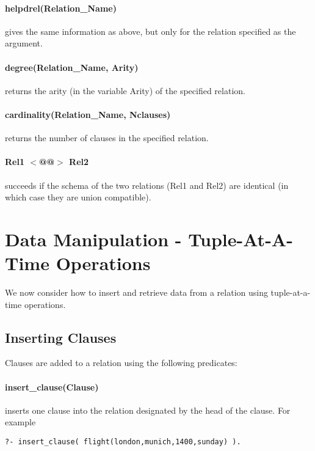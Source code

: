 \paragraph{ helpdrel(Relation\_Name) } gives the same information
as above, but only for
the relation specified as the argument. 

\paragraph{ degree(Relation\_Name, Arity) } returns the arity (in the
variable Arity) of the specified relation.

\paragraph{ cardinality(Relation\_Name, Nclauses) } returns the number of  
clauses in the specified relation. 

\paragraph{ Rel1 $<$@@$>$ Rel2 } succeeds if the schema of  
the two relations
(Rel1 and Rel2) are identical (in which case they are union compatible).


\section{Data Manipulation - Tuple-At-A-Time Operations }

We now consider how to insert and retrieve data from a relation
using tuple-at-a-time operations. 

\subsection{Inserting Clauses}
\label{insert}

Clauses are added to a relation using the following predicates:

\paragraph{ insert\_clause(Clause) } inserts one clause into the relation
designated by the head of the clause. For example

\begin{verbatim} 
?- insert_clause( flight(london,munich,1400,sunday) ).
\end{verbatim}

